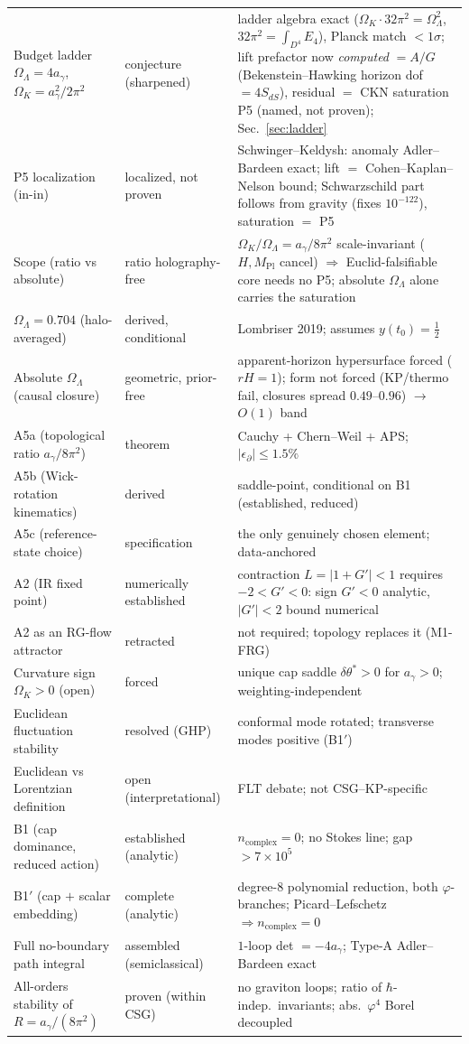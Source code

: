 \documentclass[11pt,a4paper]{article}
\theoremstyle{plain}
\theoremstyle{definition}
\theoremstyle{remark}
\newcommand{\Ok}{\Omega_K}
\newcommand{\OL}{\Omega_\Lambda}
\newcommand{\ag}{a_\gamma}
\newcommand{\Mpl}{M_{\mathrm{Pl}}}
\newcommand{\dtheta}{\delta\theta}
\begin{document}
\begin{longtable}{@{}p{6.8cm} l p{4.4cm}@{}}
Budget ladder $\OL = 4\ag$, $\Ok = \ag^2/2\pi^2$ & conjecture (sharpened) & ladder algebra exact ($\Ok\cdot32\pi^2 = \OL^2$, $32\pi^2 = \int_{D^4}E_4$), Planck match $<1\sigma$; lift prefactor now \emph{computed} $=A/G$ (Bekenstein--Hawking horizon dof $=4S_{dS}$), residual $=$ CKN saturation P5 (named, not proven); Sec.~\ref{sec:ladder} \\
P5 localization (in-in) & localized, not proven & Schwinger--Keldysh: anomaly Adler--Bardeen exact; lift $=$ Cohen--Kaplan--Nelson bound; Schwarzschild part follows from gravity (fixes $10^{-122}$), saturation $=$ P5 \\
Scope (ratio vs absolute) & ratio holography-free & $\Ok/\OL=\ag/8\pi^2$ scale-invariant ($H,\Mpl$ cancel) $\Rightarrow$ Euclid-falsifiable core needs no P5; absolute $\OL$ alone carries the saturation \\
$\OL = 0.704$ (halo-averaged) & derived, conditional & Lombriser 2019; assumes $y(t_0)=\tfrac12$ \\
Absolute $\OL$ (causal closure) & geometric, prior-free & apparent-horizon hypersurface forced ($rH{=}1$); form not forced (KP/thermo fail, closures spread $0.49$--$0.96$) $\to$ $O(1)$ band \\
A5a (topological ratio $\ag/8\pi^2$) & theorem & Cauchy + Chern--Weil + APS; $|\epsilon_\partial|\le 1.5\%$ \\
A5b (Wick-rotation kinematics) & derived & saddle-point, conditional on B1 (established, reduced) \\
A5c (reference-state choice) & specification & the only genuinely chosen element; data-anchored \\
A2 (IR fixed point) & numerically established & contraction $L=|1+G'|<1$ requires $-2<G'<0$: sign $G'<0$ analytic, $|G'|<2$ bound numerical \\
A2 as an RG-flow attractor & retracted & not required; topology replaces it (M1-FRG) \\
Curvature sign $\Ok > 0$ (open) & forced & unique cap saddle $\dtheta^*>0$ for $\ag>0$; weighting-independent \\
Euclidean fluctuation stability & resolved (GHP) & conformal mode rotated; transverse modes positive (B1$'$) \\
Euclidean vs Lorentzian definition & open (interpretational) & FLT debate; not CSG--KP-specific \\
B1 (cap dominance, reduced action) & established (analytic) & $n_{\mathrm{complex}}=0$; no Stokes line; gap $>7\times 10^5$ \\
B1$'$ (cap $+$ scalar embedding) & complete (analytic) & degree-$8$ polynomial reduction, both $\varphi$-branches; Picard--Lefschetz $\Rightarrow n_{\mathrm{complex}}=0$ \\
Full no-boundary path integral & assembled (semiclassical) & $1$-loop det $=-4\ag$; Type-A Adler--Bardeen exact \\
All-orders stability of $R=\ag/(8\pi^2)$ & proven (within CSG) & no graviton loops; ratio of $\hbar$-indep.\ invariants; abs.\ $\varphi^4$ Borel decoupled \\
\bottomrule
\end{longtable}
\end{document}
